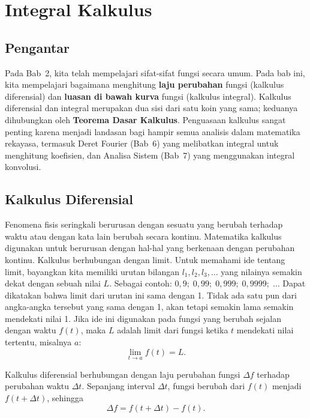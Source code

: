 \chapter{Integral Kalkulus}

\section*{Pengantar}

Pada Bab~2, kita telah mempelajari sifat-sifat fungsi secara umum. Pada bab ini, kita mempelajari bagaimana menghitung \textbf{laju perubahan} fungsi (kalkulus diferensial) dan \textbf{luasan di bawah kurva} fungsi (kalkulus integral). Kalkulus diferensial dan integral merupakan dua sisi dari satu koin yang sama; keduanya dihubungkan oleh \textbf{Teorema Dasar Kalkulus}. Penguasaan kalkulus sangat penting karena menjadi landasan bagi hampir semua analisis dalam matematika rekayasa, termasuk Deret Fourier (Bab~6) yang melibatkan integral untuk menghitung koefisien, dan Analisa Sistem (Bab~7) yang menggunakan integral konvolusi.

\section{Kalkulus Diferensial}
Fenomena fisis seringkali berurusan dengan sesuatu yang berubah terhadap waktu atau dengan kata lain berubah secara kontinu. Matematika kalkulus digunakan untuk berurusan dengan hal-hal yang berkenaan dengan perubahan kontinu. Kalkulus berhubungan dengan limit. Untuk memahami ide tentang limit, bayangkan kita memiliki urutan bilangan $l_1, l_2, l_3,\ldots$ yang nilainya semakin dekat dengan sebuah nilai $L$. Sebagai contoh: $0{,}9;\; 0{,}99;\; 0{,}999;\; 0{,}9999;\;\ldots$ Dapat dikatakan bahwa limit dari urutan ini sama dengan 1. Tidak ada satu pun dari angka-angka tersebut yang sama dengan 1, akan tetapi semakin lama semakin mendekati nilai 1. Jika ide ini digunakan pada fungsi yang berubah sejalan dengan waktu $f(t)$, maka $L$ adalah limit dari fungsi ketika $t$ mendekati nilai tertentu, misalnya $a$:
\begin{equation}
\lim_{t\rightarrow a}f(t)=L.
\end{equation}

Kalkulus diferensial berhubungan dengan laju perubahan fungsi $\Delta f$ terhadap perubahan waktu $\Delta t$. Sepanjang interval $\Delta t$, fungsi berubah dari $f(t)$ menjadi $f(t+\Delta t)$, sehingga
\begin{equation}
\Delta f = f(t+\Delta t) - f(t).
\end{equation}

